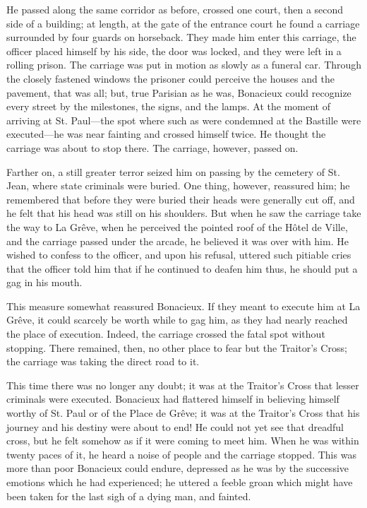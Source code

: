 He passed along the same corridor as before, crossed one court, then a second side of a building; at length, at the gate of the entrance court he found a carriage surrounded by four guards on horseback. They made him enter this carriage, the officer placed himself by his side, the door was locked, and they were left in a rolling prison. The carriage was put in motion as slowly as a funeral car. Through the closely fastened windows the prisoner could perceive the houses and the pavement, that was all; but, true Parisian as he was, Bonacieux could recognize every street by the milestones, the signs, and the lamps. At the moment of arriving at St. Paul---the spot where such as were condemned at the Bastille were executed---he was near fainting and crossed himself twice. He thought the carriage was about to stop there. The carriage, however, passed on. 

Farther on, a still greater terror seized him on passing by the cemetery of St. Jean, where state criminals were buried. One thing, however, reassured him; he remembered that before they were buried their heads were generally cut off, and he felt that his head was still on his shoulders. But when he saw the carriage take the way to La Grêve, when he perceived the pointed roof of the Hôtel de Ville, and the carriage passed under the arcade, he believed it was over with him. He wished to confess to the officer, and upon his refusal, uttered such pitiable cries that the officer told him that if he continued to deafen him thus, he should put a gag in his mouth. 

This measure somewhat reassured Bonacieux. If they meant to execute him at La Grêve, it could scarcely be worth while to gag him, as they had nearly reached the place of execution. Indeed, the carriage crossed the fatal spot without stopping. There remained, then, no other place to fear but the Traitor's Cross; the carriage was taking the direct road to it. 

This time there was no longer any doubt; it was at the Traitor's Cross that lesser criminals were executed. Bonacieux had flattered himself in believing himself worthy of St. Paul or of the Place de Grêve; it was at the Traitor's Cross that his journey and his destiny were about to end! He could not yet see that dreadful cross, but he felt somehow as if it were coming to meet him. When he was within twenty paces of it, he heard a noise of people and the carriage stopped. This was more than poor Bonacieux could endure, depressed as he was by the successive emotions which he had experienced; he uttered a feeble groan which might have been taken for the last sigh of a dying man, and fainted.